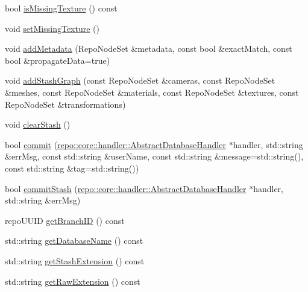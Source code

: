 \begin{DoxyCompactItemize}
\item 
bool \hyperlink{classrepo_1_1core_1_1model_1_1_repo_scene_a826242a71e6bf69893d3287d635442a7}{is\+Missing\+Texture} () const 
\item 
void \hyperlink{classrepo_1_1core_1_1model_1_1_repo_scene_a412be676a80bf9f2594b98bba1924332}{set\+Missing\+Texture} ()
\item 
void \hyperlink{classrepo_1_1core_1_1model_1_1_repo_scene_a0bb2c49fbd8d6c5534b6ef2cf33a45da}{add\+Metadata} (Repo\+Node\+Set \&metadata, const bool \&exact\+Match, const bool \&propagate\+Data=true)
\item 
void \hyperlink{classrepo_1_1core_1_1model_1_1_repo_scene_abd7f9cdc8564aafe868928c467fd0b78}{add\+Stash\+Graph} (const Repo\+Node\+Set \&cameras, const Repo\+Node\+Set \&meshes, const Repo\+Node\+Set \&materials, const Repo\+Node\+Set \&textures, const Repo\+Node\+Set \&transformations)
\item 
void \hyperlink{classrepo_1_1core_1_1model_1_1_repo_scene_ad211f115d0a6d8f398c034ce23384cf1}{clear\+Stash} ()
\item 
bool \hyperlink{classrepo_1_1core_1_1model_1_1_repo_scene_a41aa37ffba3fcd4b2dea7b23a1762644}{commit} (\hyperlink{classrepo_1_1core_1_1handler_1_1_abstract_database_handler}{repo\+::core\+::handler\+::\+Abstract\+Database\+Handler} $\ast$handler, std\+::string \&err\+Msg, const std\+::string \&user\+Name, const std\+::string \&message=std\+::string(), const std\+::string \&tag=std\+::string())
\item 
bool \hyperlink{classrepo_1_1core_1_1model_1_1_repo_scene_a7ec2fae544505ae7d73c458e7c847cd5}{commit\+Stash} (\hyperlink{classrepo_1_1core_1_1handler_1_1_abstract_database_handler}{repo\+::core\+::handler\+::\+Abstract\+Database\+Handler} $\ast$handler, std\+::string \&err\+Msg)
\item 
repo\+U\+U\+I\+D \hyperlink{classrepo_1_1core_1_1model_1_1_repo_scene_aa4ac0636da7d8d27d9615bd6e23ac484}{get\+Branch\+I\+D} () const 
\item 
std\+::string \hyperlink{classrepo_1_1core_1_1model_1_1_repo_scene_a21ac57fcfca6cedcc2aeddce7938c809}{get\+Database\+Name} () const 
\item 
std\+::string \hyperlink{classrepo_1_1core_1_1model_1_1_repo_scene_a6307f0c0df32f10d603028a75afb8e50}{get\+Stash\+Extension} () const 
\item 
std\+::string \hyperlink{classrepo_1_1core_1_1model_1_1_repo_scene_a4606af3c279123479cd7b2bf120c7bbe}{get\+Raw\+Extension} () const 
\item 

\end{DoxyCompactItemize}
